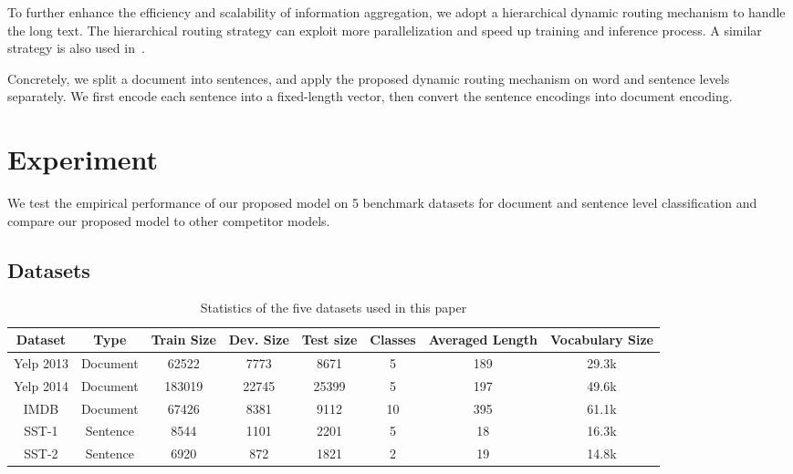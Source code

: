 \documentclass[11pt]{article}
\begin{document}
To further enhance the efficiency and scalability of information aggregation, we adopt a hierarchical dynamic routing mechanism to handle the long text. The hierarchical routing strategy can exploit more parallelization and speed up training and inference process. A similar strategy is also used in~\cite{yang2016hierarchical}.

Concretely, we split a document into sentences, and apply the proposed dynamic routing mechanism on word and sentence levels separately. We first encode each sentence into a fixed-length vector, then convert the sentence encodings into document encoding.





\section{Experiment}
We test the empirical performance of our proposed model on 5 benchmark datasets for document and sentence level classification and compare our proposed model to other competitor models.
\subsection{Datasets}
\begin{table}[t!] \setlength{\tabcolsep}{3pt}
  \centering \begin{tabular}{cccccccc}
    \toprule
\textbf{Dataset} &\textbf{Type} &\textbf{Train Size} & \textbf{Dev. Size} &\textbf{Test size} & \textbf{Classes}  &\textbf{Averaged Length}   &\textbf{Vocabulary Size}\\
    \midrule Yelp 2013         &Document      &62522       &7773    &8671     &5    &189 	&29.3k\\
Yelp 2014         &Document      &183019      &22745   &25399 	 &5    &197     &49.6k\\
IMDB          	  &Document      &67426      &8381   &9112 	     &10    &395    &61.1k\\
SST-1         	  &Sentence      &8544      &1101   &2201	     &5    &18      &16.3k\\
SST-2         	  &Sentence      &6920      &872   &1821	     &2    &19      &14.8k\\
    \bottomrule
  \end{tabular}
  \caption{Statistics of the five datasets used in this paper}
  \label{tab:dataset}
\end{table}
\end{document}
